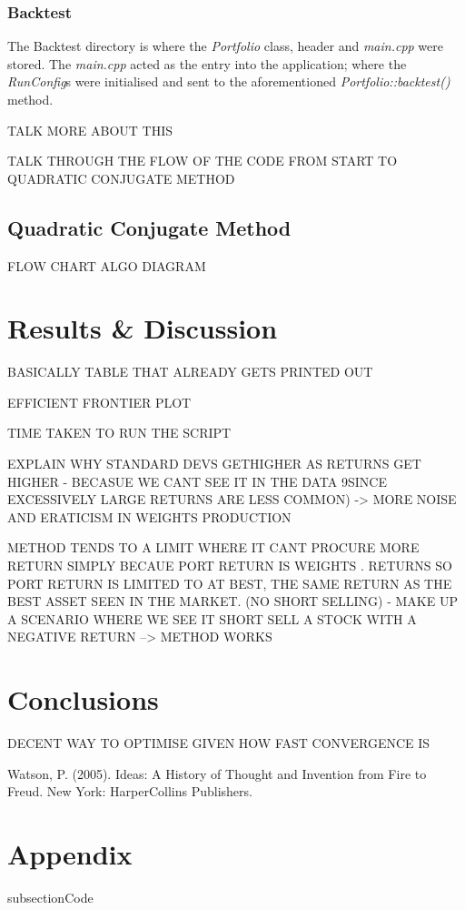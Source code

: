\documentclass{article}
\begin{document}
\subsubsection{Backtest}
\label{sec:backtestcode}

The Backtest directory is where the \textit{Portfolio} class, header and \textit{main.cpp} were stored. The \textit{main.cpp} acted as the entry into the application; where the \textit{RunConfig}s were initialised and sent to the aforementioned \textit{Portfolio::backtest()} method.

TALK MORE ABOUT THIS

TALK THROUGH THE FLOW OF THE CODE FROM START TO QUADRATIC CONJUGATE METHOD


\subsection{Quadratic Conjugate Method}
\label{sec:qcm}


FLOW CHART ALGO DIAGRAM

\section{Results \& Discussion}
\label{sec:results}

BASICALLY TABLE THAT ALREADY GETS PRINTED OUT

EFFICIENT FRONTIER PLOT

TIME TAKEN TO RUN THE SCRIPT

EXPLAIN WHY STANDARD DEVS GETHIGHER AS RETURNS GET HIGHER - BECASUE WE CANT SEE IT IN THE DATA 9SINCE EXCESSIVELY LARGE RETURNS ARE LESS COMMON) -> MORE NOISE AND ERATICISM IN WEIGHTS PRODUCTION 

METHOD TENDS TO A LIMIT WHERE IT CANT PROCURE MORE RETURN SIMPLY BECAUE PORT RETURN IS WEIGHTS . RETURNS SO PORT RETURN IS LIMITED TO AT BEST, THE SAME RETURN AS THE BEST ASSET SEEN IN THE MARKET. (NO SHORT SELLING) - MAKE UP A SCENARIO WHERE WE SEE IT SHORT SELL A STOCK WITH A NEGATIVE RETURN --> METHOD WORKS


\section{Conclusions}
\label{sec:concs}


DECENT WAY TO OPTIMISE GIVEN HOW FAST CONVERGENCE IS




\begin{thebibliography}{}
\label{sec:thebibliography}
	 Watson, P. (2005). Ideas: A History of Thought and Invention from Fire to Freud. New York: HarperCollins Publishers.
	
	
\end{thebibliography} 



\section{Appendix} 
\label{sec:appendix}

subsection{Code} 
\label{sec:code}
\end{document}
